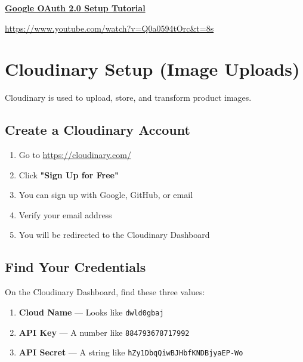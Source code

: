 \documentclass[12pt,a4paper]{article}
\begin{document}
\begin{tcolorbox}[colback=infobox,colframe=primaryblue,title= YouTube Tutorial]
    \href{https://www.youtube.com/watch?v=Q0a0594tOrc&t=8s}{\textbf{Google OAuth 2.0 Setup Tutorial}}
    
    \url{https://www.youtube.com/watch?v=Q0a0594tOrc&t=8s}
\end{tcolorbox}

\newpage

\section{Cloudinary Setup (Image Uploads)}

Cloudinary is used to upload, store, and transform product images.

\subsection{Create a Cloudinary Account}

\begin{enumerate}[leftmargin=*,itemsep=0.5em]
    \item Go to \url{https://cloudinary.com/}
    \item Click \textbf{"Sign Up for Free"}
    \item You can sign up with Google, GitHub, or email
    \item Verify your email address
    \item You will be redirected to the Cloudinary Dashboard
\end{enumerate}

\subsection{Find Your Credentials}

On the Cloudinary Dashboard, find these three values:

\begin{enumerate}[leftmargin=*,itemsep=0.5em]
    \item \textbf{Cloud Name} — Looks like \texttt{dwld0gbaj}
    \item \textbf{API Key} — A number like \texttt{884793678717992}
    \item \textbf{API Secret} — A string like \texttt{hZy1DbqQiwBJHbfKNDBjyaEP-Wo}
\end{enumerate}
\end{document}
